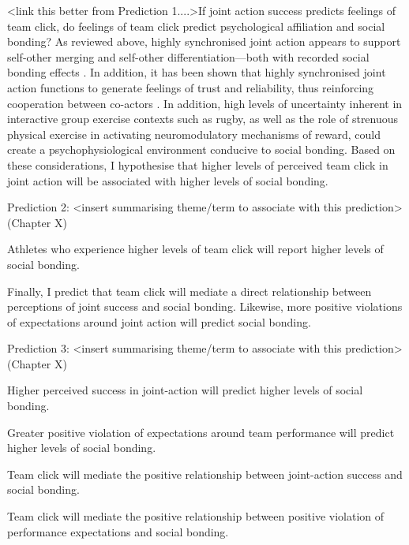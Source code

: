 \begin{CJK}{UTF8}{gbsn}
  \bigskip

   <link this better from Prediction 1....>If joint action success predicts feelings of team click, do feelings of team click predict psychological affiliation and social bonding? As reviewed above, highly synchronised joint action appears to support self-other merging and self-other differentiation---both with recorded social bonding effects \citep{Mogan2017,Milward2016}. In addition, it has been shown that highly synchronised joint action functions to generate feelings of trust and reliability, thus reinforcing cooperation between co-actors \citep{Reddish2013a}. In addition, high levels of uncertainty inherent in interactive group exercise contexts such as rugby, as well as the role of strenuous physical exercise in activating neuromodulatory mechanisms of reward, could create a psychophysiological environment conducive to social bonding.  Based on these considerations, I hypothesise that higher levels of perceived team click in joint action will be associated with higher levels of social bonding.
  \bigskip
  \begin{indent}
  \begin{description}
Prediction 2: <insert summarising theme/term to associate with this prediction> (Chapter X)
    \item [Prediction 2.a] Athletes who experience higher levels of team click will report higher levels of social bonding.
  \end{description}
  \end{indent}

  Finally, I predict that team click will mediate a direct relationship between perceptions of joint success and social bonding.  Likewise, more positive violations of expectations around joint action will predict social bonding.
  \bigskip
  \begin{indent}
  \begin{description}
Prediction 3: <insert summarising theme/term to associate with this prediction> (Chapter X)
    \item [Prediction 3.a] Higher perceived success in joint-action will predict higher levels of social bonding.
   \item [Prediction 3.b] Greater positive violation of expectations around team performance will predict higher levels of social bonding.
    \item [Prediction 4.a] Team click will mediate the positive relationship between joint-action success and social bonding.
    \item [Prediction 4.b] Team click will mediate the positive relationship between positive violation of performance expectations and social bonding.


\end{description}
\end{indent}
\end{CJK}
